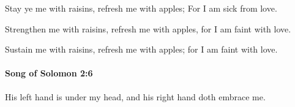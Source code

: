 			\begin{versebox}
					\item[BHS] 
					\item[LXX] 
					\item[ASV] Stay ye me with raisins, refresh me with apples; For I am sick from love.
					\item[NIV] Strengthen me with raisins, refresh me with apples, for I am faint with love.
					\item[NRSV] Sustain me with raisins, refresh me with apples; for I am faint with love.
			\end{versebox}

		\paragraph{Song of Solomon 2:6} %
			\label{SONGOFSOLOMON-2-6}

			His left hand is under my head, and his right hand doth embrace me.

